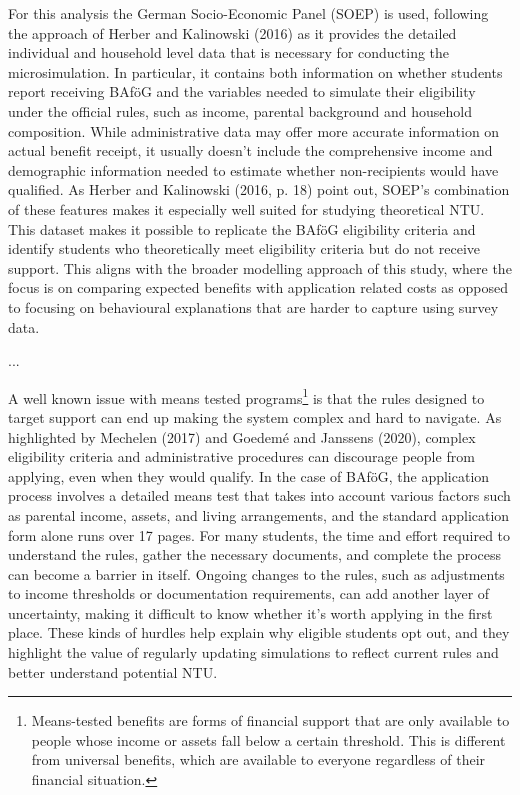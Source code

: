 For this analysis the German Socio-Economic Panel (SOEP) is used, following the approach of Herber and Kalinowski (2016) as it provides the detailed individual and household level data that is necessary for conducting the microsimulation. In particular, it contains both information on whether students report receiving BAföG and the variables needed to simulate their eligibility under the official rules, such as income, parental background and household composition. While administrative data may offer more accurate information on actual benefit receipt, it usually doesn’t include the comprehensive income and demographic information needed to estimate whether non-recipients would have qualified. As Herber and Kalinowski (2016, p. 18) point out, SOEP’s combination of these features makes it especially well suited for studying theoretical NTU. This dataset makes it possible to replicate the BAföG eligibility criteria and identify students who theoretically meet eligibility criteria but do not receive support. This aligns with the broader modelling approach of this study, where the focus is on comparing expected benefits with application related costs as opposed to focusing on behavioural explanations that are harder to capture using survey data. 

...

A well known issue with means tested programs\footnote{Means-tested benefits are forms of financial support that are only available to people whose income or assets fall below a certain threshold. This is different from universal benefits, which are available to everyone regardless of their financial situation.} is that the rules designed to target support can end up making the system complex and hard to navigate. As highlighted by Mechelen (2017) and Goedemé and Janssens (2020), complex eligibility criteria and administrative procedures can discourage people from applying, even when they would qualify. In the case of BAföG, the application process involves a detailed means test that takes into account various factors such as parental income, assets, and living arrangements, and the standard application form alone runs over 17 pages. For many students, the time and effort required to understand the rules, gather the necessary documents, and complete the process can become a barrier in itself. Ongoing changes to the rules, such as adjustments to income thresholds or documentation requirements, can add another layer of uncertainty, making it difficult to know whether it’s worth applying in the first place. These kinds of hurdles help explain why eligible students opt out, and they highlight the value of regularly updating simulations to reflect current rules and better understand potential NTU.

